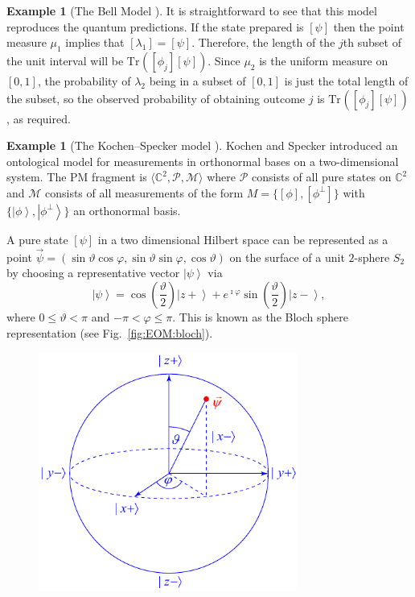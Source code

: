 \documentclass[DIV=calc,paper=a4,fontsize=11pt,twocolumn]{scrartcl} %
\theoremstyle{definition}
\newtheorem{example}[definition]{Example}
\theoremstyle{plain}
\newcommand{\Ket}[1]{\ensuremath{\left \vert #1 \right \rangle}}
\newcommand{\Proj}[1]{\ensuremath{\left [ #1 \right ]}}
\newcommand{\Tr}[2][]{\ensuremath{\text{Tr}_{#1} \left ( #2 \right )}}
\begin{document}
\begin{example}[The Bell Model \cite{Bell1966}]
It is straightforward to see that this model reproduces the quantum
predictions.  If the state prepared is $\Proj{\psi}$ then the point
measure $\mu_1$ implies that $\Proj{\lambda_1} = \Proj{\psi}$.
Therefore, the length of the $j$th subset of the unit interval will
be $\Tr{\Proj{\phi_j}\Proj{\psi}}$.  Since $\mu_2$ is the
uniform measure on $[0,1]$, the probability of $\lambda_2$ being in
a subset of $[0,1]$ is just the total length of the subset, so the
observed probability of obtaining outcome $j$ is
$\Tr{\Proj{\phi_j}\Proj{\psi}}$, as required.
\end{example}

\begin{example}[The Kochen--Specker model \cite{Kochen1967}]
\label{exa:EOM:KS}
Kochen and Specker introduced an ontological model for measurements
in orthonormal bases on a two-dimensional system.  The
PM fragment is $\langle \mathbb{C}^2, \mathcal{P},
\mathcal{M} \rangle$ where $\mathcal{P}$ consists of all pure states
on $\mathbb{C}^2$ and $\mathcal{M}$ consists of all measurements of
the form $M = \{\Proj{\phi},\Proj{\phi^{\perp}}\}$ with
$\{\Ket{\phi},\Ket{\phi^{\perp}}\}$ an orthonormal basis.

A pure state $\Proj{\psi}$ in a two dimensional Hilbert space can be
represented as a point $\vec{\psi} = (\sin \vartheta \cos \varphi,
\sin \vartheta \sin \varphi, \allowbreak \cos \vartheta)$ on the
surface of a unit $2$-sphere $S_2$ by choosing a representative
vector $\Ket{\psi}$ via
\begin{equation}
\label{eq:EOM:Bloch}
\Ket{\psi} = \cos(\frac{\vartheta}{2}) \Ket{z+} +
e^{\imath \varphi}\sin(\frac{\vartheta}{2}) \Ket{z-},
\end{equation}
where $0 \leq \vartheta < \pi$ and $-\pi < \varphi \leq \pi$.  This
is known as the Bloch sphere representation (see
Fig.~\ref{fig:EOM:bloch}).
\begin{figure}[t!]
\centering
\includegraphics[width=85mm]{Fig8.pdf}
\caption{}
\end{figure}


\end{example}
\end{document}
